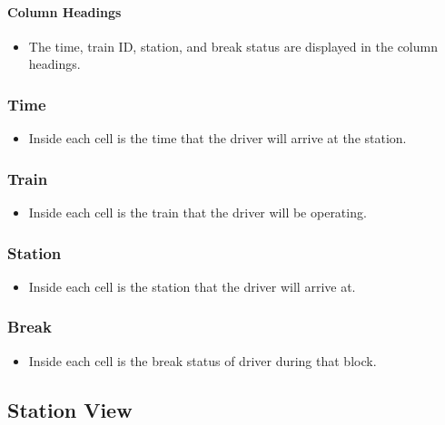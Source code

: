 \documentclass[letterpaper]{article}
\begin{document}
	\paragraph{Column Headings}
		\begin{itemize}
			\item The time, train ID, station, and break status are displayed in the column headings.
		\end{itemize}
		
	\subsubsection{Time}
		\begin{itemize}
			\item Inside each cell is the time that the driver will arrive at the station.
		\end{itemize}
	
	\subsubsection{Train}
		\begin{itemize}
			\item Inside each cell is the train that the driver will be operating.
		\end{itemize}
		
	\subsubsection{Station}
		\begin{itemize}
			\item Inside each cell is the station that the driver will arrive at.
		\end{itemize}
		
	\subsubsection{Break}
		\begin{itemize}
			\item Inside each cell is the break status of driver during that block.
		\end{itemize}


\subsection{Station View}
\end{document}
